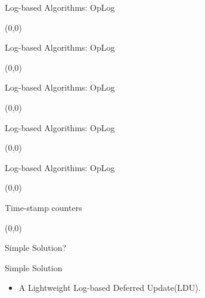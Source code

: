 \documentclass[english]{beamer} %
\begin{document}
\begin{frame}{Log-based Algorithms: OpLog}
\begin{textblock}{1}(0,0)
\end{textblock}
\end{frame}


\begin{frame}{Log-based Algorithms: OpLog}
\begin{textblock}{1}(0,0)
\end{textblock}
\end{frame}


\begin{frame}{Log-based Algorithms: OpLog}
\begin{textblock}{1}(0,0)
\end{textblock}
\end{frame}

\begin{frame}{Log-based Algorithms: OpLog}
\begin{textblock}{1}(0,0)
\end{textblock}
\end{frame}



\begin{frame}{Log-based Algorithms: OpLog}
\begin{textblock}{1}(0,0)
\end{textblock}
\end{frame}


\begin{frame}{Time-stamp counters}
\begin{textblock}{1}(0,0)
\end{textblock}
\end{frame}

\begin{frame}{Simple Solution?}
\end{frame}

\begin{frame}{Simple Solution}
    \begin{itemize}[<+-| alert@+>]
    \item A Lightweight Log-based Deferred Update(LDU).
    \end{itemize}
\end{frame}
\end{document}
